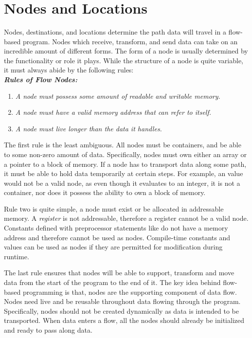\section{Nodes and Locations}

\paragraph{  } Nodes, destinations, and locations determine the path data will travel in a flow-based program. Nodes which receive, transform, and send data can take on an incredible amount of different forms. The form of a node is usually determined by the functionality or role it plays. While the structure of a node is quite variable, it must always abide by the following rules: \\

\textbf{\emph{Rules of Flow Nodes:}}

\begin{enumerate}
\item \emph{A node must possess some amount of readable and writable memory.}
\item \emph{A node must have a valid memory address that can refer to itself.}
\item \emph{A node must live longer than the data it handles.}
\end{enumerate}

\par The first rule is the least ambiguous. All nodes must be containers, and be able to some non-zero amount of data. Specifically, nodes must own either an array or a pointer to a block of memory. If a node has to transport data along some path, it must be able to hold data temporarily at certain steps. For example, an  value would not be a valid node, as even though it evaluates to an integer, it is not a container, nor does it possess the ability to own a block of memory.

\par Rule two is quite simple, a node must exist or be allocated in addressable memory. A \emph{register} is not addressable, therefore a register cannot be a valid node. Constants defined with preprocessor statements like  do not have a memory address and therefore cannot be used as nodes. Compile-time constants and values can be used as nodes if they are permitted for modification during runtime.

\par The last rule ensures that nodes will be able to support, transform and move data from the start of the program to the end of it. The key idea behind flow-based programming is that, nodes are the supporting component of data flow. Nodes need live and be reusable throughout data flowing through the program. Specifically, nodes should not be created dynamically as data is intended to be transported. When data enters a flow, all the nodes should already be initialized and ready to pass along data.

